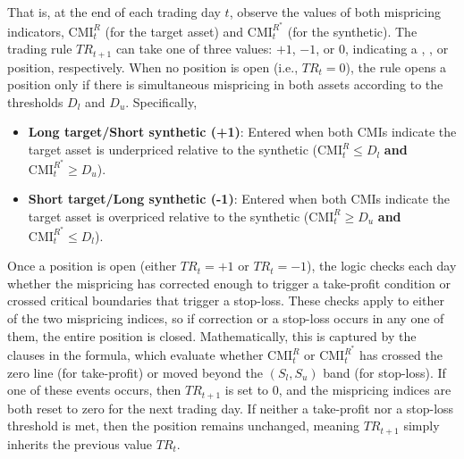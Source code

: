 That is, at the end of each trading day \(t\), observe the values of both mispricing indicators, \(\mathrm{CMI}_t^R\) (for the target asset) and \(\mathrm{CMI}_t^{R^*}\) (for the synthetic). The trading rule \(TR_{t+1}\) can take one of three values: \(+1\), \(-1\), or \(0\), indicating a , , or  position, respectively. When no position is open (i.e., \(TR_{t} = 0\)), the rule opens a position only if there is simultaneous mispricing in both assets according to the thresholds \(D_l\) and \(D_u\). 
Specifically,
\begin{itemize}
  \item \textbf{Long target/Short synthetic (+1)}: Entered when both CMIs indicate the target asset is underpriced relative to the synthetic ($\text{CMI}_t^R \leq D_l$ \textbf{and} $\text{CMI}_t^{R^*} \geq D_u$).
  \item \textbf{Short target/Long synthetic (-1)}: Entered when both CMIs indicate the target asset is overpriced relative to the synthetic ($\text{CMI}_t^R \geq D_u$ \textbf{and} $\text{CMI}_t^{R^*} \leq D_l$).
\end{itemize} 

Once a position is open (either \(TR_{t} = +1\) or \(TR_{t} = -1\)), the logic checks each day whether the mispricing has corrected enough to trigger a take-profit condition or crossed critical boundaries that trigger a stop-loss. These checks apply to either of the two mispricing indices, so if correction or a stop-loss occurs in any one of them, the entire position is closed. Mathematically, this is captured by the  clauses in the formula, which evaluate whether \(\mathrm{CMI}_t^R\) or \(\mathrm{CMI}_t^{R^*}\) has crossed the zero line (for take-profit) or moved beyond the \((S_l, S_u)\) band (for stop-loss). If one of these events occurs, then \(TR_{t+1}\) is set to \(0\), and the mispricing indices are both reset to zero for the next trading day. 
If neither a take-profit nor a stop-loss threshold is met, then the position remains unchanged, meaning \(TR_{t+1}\) simply inherits the previous value \(TR_{t}\).

